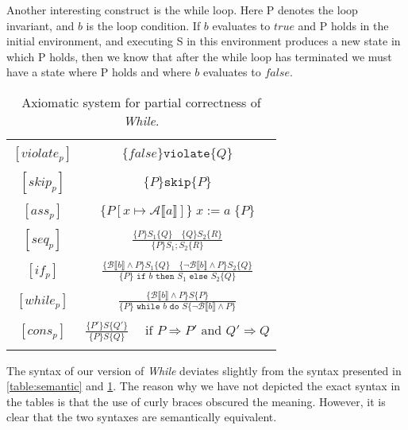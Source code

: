 Another interesting construct is the while loop.
Here P denotes the loop invariant, and $b$ is the loop condition. 
If $b$ evaluates to $true$ and P holds in the initial environment, and executing S in this environment produces a new state in which P holds, then we know that after the while loop has terminated we must have a state where P holds and where $b$ evaluates to $false$.

\begin{table}[h!]
\centering
\begin{tabular}{|c c|} 
 \hline
	& \\
 $[violate_p ]$ & $\{ false \} \texttt{violate} \{ Q \}$ \\ 
	& \\
 $[skip_p ]$ & $\{ P \} \texttt{skip} \{ P \}$ \\ 
	& \\
 $[ass_p ]$ & $\{ P[x \mapsto \mathcal{A} \llbracket a \rrbracket ] \} \; x := a \; \{ P \}$ \\ 
	& \\
 $[seq_p ]$ & 
		$\frac{\{ P \} S_1 \{Q \} \quad \{ Q\} S_2 \{ R \}}{\{ P \} S_1;S_2 \{ R \}}$ \\ 
	& \\
 $[if_p ]$ & 
		$\frac{ \{\mathcal{B} \llbracket b \rrbracket \land P \} S_1 \{ Q \} \quad 
           \{ \neg \mathcal{B} \llbracket b \rrbracket \land P\} S_2 \{ Q \} }
          {\{P\} \texttt{ if } b \texttt{ then } S_1 \texttt{ else } S_2 \{Q\}}$ \\
	& \\
 $[while_p ]$ & 
		$\frac{ \{\mathcal{B} \llbracket b \rrbracket \land P \} S \{ P \}}
          {\{P\} \texttt{ while } b \texttt{ do } S 
           \{\neg \mathcal{B} \llbracket b \rrbracket \land P\}}$ \\
	& \\
 $[cons_p ]$ & 
		$\frac{ \{P'\} S \{Q'\}}{\{P\} S \{Q\}} \quad 
     \text{ if } P \Rightarrow P' \text{ and } Q' \Rightarrow Q $ \\
	& \\
 \hline
\end{tabular}
\caption{Axiomatic system for partial correctness of \textit{While}.}
\label{table:axiomatic}
\end{table}

The syntax of our version of \textit{While} deviates slightly from the syntax presented in \cref{table:semantic} and \cref{table:axiomatic}.
The reason why we have not depicted the exact syntax in the tables is that the use of curly braces obscured the meaning.
However, it is clear that the two syntaxes are semantically equivalent. 

